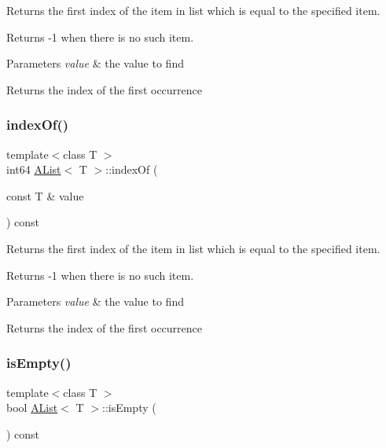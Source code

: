 Returns the first index of the item in list which is equal to the specified item. 

Returns -\/1 when there is no such item.


\begin{DoxyParams}{Parameters}
{\em value} & the value to find \\
\hline
\end{DoxyParams}
\begin{DoxyReturn}{Returns}
the index of the first occurrence 
\end{DoxyReturn}
\mbox{\label{class_a_list_a4b097672b446185673cf1ec2df799110}} 
\subsubsection{\texorpdfstring{indexOf()}{indexOf()}}
{\footnotesize\ttfamily template$<$class T $>$ \\
int64 \mbox{\hyperlink{class_a_list}{A\+List}}$<$ T $>$\+::index\+Of (\begin{DoxyParamCaption}\item[{const T \&}]{value }\end{DoxyParamCaption}) const}



Returns the first index of the item in list which is equal to the specified item. 

Returns -\/1 when there is no such item.


\begin{DoxyParams}{Parameters}
{\em value} & the value to find \\
\hline
\end{DoxyParams}
\begin{DoxyReturn}{Returns}
the index of the first occurrence 
\end{DoxyReturn}
\mbox{\label{class_a_list_ab0c4bd9783b1a181471e05f9fda79138}} 
\subsubsection{\texorpdfstring{isEmpty()}{isEmpty()}}
{\footnotesize\ttfamily template$<$class T $>$ \\
bool \mbox{\hyperlink{class_a_list}{A\+List}}$<$ T $>$\+::is\+Empty (\begin{DoxyParamCaption}{ }\end{DoxyParamCaption}) const}



